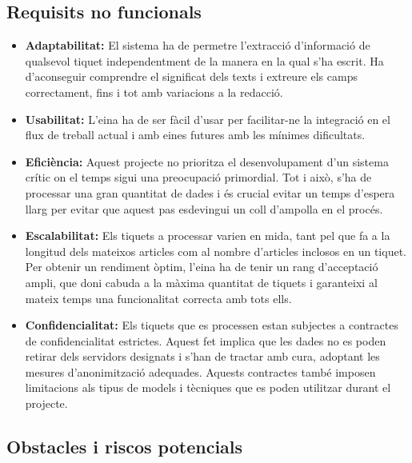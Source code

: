 \subsection{Requisits no funcionals} \label{ssec:abast-requisits-no-funcionals}

\begin{itemize}
    \item \textbf{Adaptabilitat:} El sistema ha de permetre l'extracció d'informació de qualsevol tiquet independentment de la manera en la qual s'ha escrit. Ha d'aconseguir comprendre el significat dels texts i extreure els camps correctament, fins i tot amb variacions a la redacció.
    \item \textbf{Usabilitat:} L'eina ha de ser fàcil d'usar per facilitar-ne la integració en el flux de treball actual i amb eines futures amb les mínimes dificultats.
    \item \textbf{Eficiència:} Aquest projecte no prioritza el desenvolupament d'un sistema crític on el temps sigui una preocupació primordial. Tot i això, s'ha de processar una gran quantitat de dades i és crucial evitar un temps d'espera llarg per evitar que aquest pas esdevingui un coll d'ampolla en el procés.
    \item \textbf{Escalabilitat:} Els tiquets a processar varien en mida, tant pel que fa a la longitud dels mateixos articles com al nombre d'articles inclosos en un tiquet. Per obtenir un rendiment òptim, l'eina ha de tenir un rang d'acceptació ampli, que doni cabuda a la màxima quantitat de tiquets i garanteixi al mateix temps una funcionalitat correcta amb tots ells.
    \item \textbf{Confidencialitat:} Els tiquets que es processen estan subjectes a contractes de confidencialitat estrictes. Aquest fet implica que les dades no es poden retirar dels servidors designats i s'han de tractar amb cura, adoptant les mesures d'anonimització adequades. Aquests contractes també imposen limitacions als tipus de models i tècniques que es poden utilitzar durant el projecte.
\end{itemize}


\subsection{Obstacles i riscos potencials} \label{ssec:abast-riscos}

